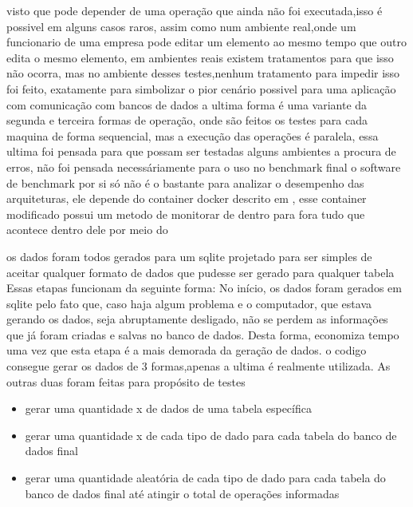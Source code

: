 \documentclass[
	12pt,				%
	openright,			%
	oneside,			%
	a4paper,			%
	english,			%
	french,				%
	spanish,			%
	brazil,				%
	]{abntex2}
\begin{document}
visto que pode depender de uma operação que ainda não foi executada,isso é possivel em alguns casos raros,
assim como num ambiente real,onde um funcionario de uma empresa pode editar um elemento ao mesmo tempo que outro edita o mesmo elemento,
em ambientes reais existem tratamentos para que isso não ocorra,
mas no ambiente desses testes,nenhum tratamento para impedir isso foi feito,
exatamente para simbolizar o pior cenário possivel para uma aplicação com comunicação com bancos de dados\newline
a ultima forma é uma variante da segunda e terceira formas de operação,
onde são feitos os testes para cada maquina de forma sequencial, mas a execução das operações é paralela,
essa ultima foi pensada para que possam ser testadas alguns ambientes a procura de erros,
não foi pensada necessáriamente para o uso no benchmark final\newline
o software de benchmark por si só não é o bastante para analizar o desempenho das arquiteturas,
ele depende do container docker descrito em ,
esse container modificado possui um metodo de monitorar de dentro para fora tudo que acontece dentro dele por meio do  \newline


os dados foram todos gerados para um sqlite projetado para ser simples de aceitar qualquer formato de dados que pudesse ser gerado para qualquer tabela
Essas etapas funcionam da seguinte forma:\newline
No início, os dados foram gerados em sqlite pelo fato que, caso haja algum problema e o computador, que estava gerando os dados, seja abruptamente desligado,
não se perdem as informações que já foram criadas e salvas no banco de dados. Desta forma, economiza tempo uma vez que esta etapa é a mais demorada da geração de dados.\newline
o codigo consegue gerar os dados de 3 formas,apenas a ultima é realmente utilizada.
As outras duas foram feitas para propósito de testes

\begin{itemize}
\item gerar uma quantidade x de dados de uma tabela específica
\item gerar uma quantidade x de cada tipo de dado para cada tabela do banco de dados final
\item gerar uma quantidade aleatória de cada tipo de dado para cada tabela do banco de dados final até atingir o total de operações informadas
\end{itemize}
\end{document}
